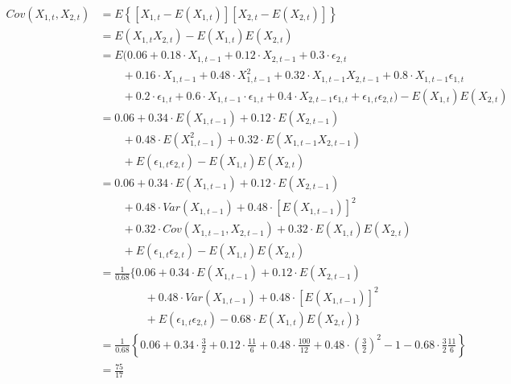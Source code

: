 \begin{solution}
\begin{equation}
\begin{aligned}
Cov(X_{1,t},X_{2,t}) 	& = E\left\{[X_{1,t} - E(X_{1,t})][X_{2,t} - E(X_{2,t})]\right\} \\
											& = E(X_{1,t}X_{2,t}) - E(X_{1,t}) E(X_{2,t}) \\
											& = E(0.06 + 0.18 \cdot X_{1,t-1} + 0.12 \cdot X_{2,t-1} + 0.3 \cdot \epsilon_{2,t} \\
											& \qquad	 + 0.16 \cdot X_{1,t-1} + 0.48 \cdot X_{1,t-1}^2 + 0.32 \cdot X_{1,t-1} X_{2,t-1} + 0.8 \cdot X_{1,t-1} \epsilon_{1,t} \\
											& \qquad	 + 0.2 \cdot \epsilon_{1,t} + 0.6 \cdot X_{1,t-1} \cdot \epsilon_{1,t} + 0.4 \cdot X_{2,t-1} \epsilon_{1,t}
															+ \epsilon_{1,t} \epsilon_{2,t} ) - E(X_{1,t}) E(X_{2,t})	\\
											& = 0.06 + 0.34 \cdot E(X_{1,t-1}) + 0.12 \cdot E(X_{2,t-1}) \\
											& \qquad + 0.48 \cdot E(X_{1,t-1}^2) + 0.32 \cdot E(X_{1,t-1} X_{2,t-1}) \\
											& \qquad + E(\epsilon_{1,t} \epsilon_{2,t}) - E(X_{1,t}) E(X_{2,t}) \\
											& = 0.06 + 0.34 \cdot E(X_{1,t-1}) + 0.12 \cdot E(X_{2,t-1}) \\
											& \qquad + 0.48 \cdot Var(X_{1,t-1}) + 0.48 \cdot [E(X_{1,t-1})]^2 \\
											& \qquad + 0.32 \cdot Cov(X_{1,t-1}, X_{2,t-1}) + 0.32 \cdot E(X_{1,t}) E(X_{2,t}) \\
											& \qquad + E(\epsilon_{1,t} \epsilon_{2,t}) - E(X_{1,t}) E(X_{2,t})	\\
											& = \frac{1}{0.68} \{0.06 + 0.34 \cdot E(X_{1,t-1}) + 0.12 \cdot E(X_{2,t-1}) \\
											& \qquad \qquad + 0.48 \cdot Var(X_{1,t-1}) + 0.48 \cdot [E(X_{1,t-1})]^2 \\
											& \qquad \qquad + E(\epsilon_{1,t} \epsilon_{2,t}) -0.68 \cdot E(X_{1,t}) E(X_{2,t}) \} \\
											& = \frac{1}{0.68} \left \{ 0.06 + 0.34 \cdot \frac{3}{2} + 0.12 \cdot \frac{11}{6} 
											                     + 0.48 \cdot \frac{100}{12} + 0.48 \cdot \left(\frac{3}{2}\right)^2 
											                     - 1 -0.68 \cdot \frac{3}{2} \frac{11}{6} \right\}	\\
											& = \frac{75}{17}
\end{aligned}
\end{equation}


\end{solution}
